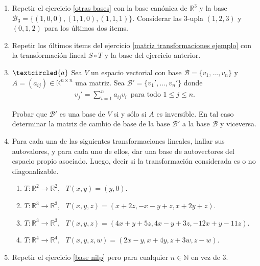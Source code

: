 \begin{enumerate}[resume, topsep=5pt,itemsep=5pt]



    \item\label{otras bases 3} Repetir el ejercicio \ref{otras bases} con la base canónica de $\mathbb{R}^3$ y la base $\mathcal{B}_3=\{(1,0,0),(1,1,0),(1,1,1)\}$. Considerar las $3$-upla $(1,2,3)$ y $(0,1,2)$ para los últimos dos items.


\item Repetir los últimos items del ejercicio \ref{matriz transformaciones ejemplo} con la transformación lineal $S\circ T$ y la base del ejercicio anterior.

\item\label{cambio de base} $\textcircled{a}$ Sea $V$ un espacio vectorial con base $\mathcal{B}=\{v_1, ..., v_n\}$ y $A=(a_{ij})\in\mathbb{K}^{n\times n}$ una matriz. Sea $\mathcal{B}'=\{v_1', ..., v_n'\}$ donde
\begin{align*}
v_j'=\sum_{i=1}^na_{ij}v_i\,\mbox{ para todo $1\leq j\leq n$}. 
\end{align*}

Probar que $\mathcal{B}'$ es una base de $V$ si y sólo si $A$ es inversible. En tal caso determinar la matriz de cambio de base de la base $\mathcal{B}'$ a la base $\mathcal{B}$ y viceversa.

\item Para cada una de las siguientes transformaciones lineales, hallar sus autovalores,
    y para cada uno de ellos, dar una base de autovectores del espacio propio asociado. Luego, decir si la
    transformación considerada es o no  diagonalizable.
    \begin{enumerate}
        \item $T:\mathbb{R}^2\to \mathbb{R}^2$, \ $T(x,y)=(y,0)$.
        \item $T:\mathbb{R}^3\to \mathbb{R}^3$, \ $T(x,y,z)=(x+2z,-x-y+z,x+2y+z)$.
        \item $T:\mathbb{R}^3\to \mathbb{R}^3$, \ $T(x,y,z)=(4x+y+5z,4x-y+3z,-12x+y-11z)$.
        \item $T:\mathbb{R}^4\to \mathbb{R}^4$, \ $T(x,y,z,w)=(2x-y,x+4y,z+3w,z-w)$.
    \end{enumerate}

\item Repetir el ejercicio \ref{base nilp}  pero para cualquier $n\in\mathbb{N}$ en vez de $3$.


\end{enumerate}
